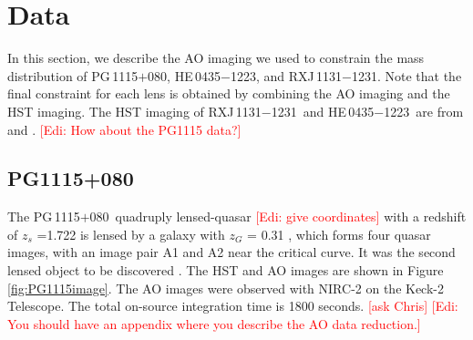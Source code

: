 \documentclass[useAMS,usenatbib]{mnras}
\newcommand\todo[1]{\textcolor{red}{#1}}
\newcommand\rxj{RXJ\,1131$-$1231}
\newcommand\he{HE\,0435$-$1223}
\newcommand\pg{PG\,1115$+$080}
\def\kms {\rm km\,s^{-1}}
\begin{document}







\section{Data}
In this section, we describe the AO imaging we used to constrain the mass distribution of \pg, \he, and \rxj. Note that the final constraint for each lens is obtained by combining the AO imaging and the HST imaging. The HST imaging of \rxj~and \he~are from \citet{SuyuEtal13} and \citet{WongEtal17}. \todo{[Edi: How about the PG1115 data?]}
\label{sec:data}




\subsection{PG1115+080}
The \pg~quadruply lensed-quasar \todo{[Edi: give coordinates]} with a redshift of $z_{s}$ =1.722 is lensed by a galaxy with $z_{G}$ = 0.31 \citep{HenryEtal86,ChristianEtal87,Tonry98}, which forms four quasar images, with an image pair A1 and A2 near the critical curve. It was the second lensed object to be discovered \citep{WeymannEtal80}. 
The HST and AO images are shown in Figure \ref{fig:PG1115image}. The AO images were observed with NIRC-2 on the Keck-2 Telescope. The total on-source integration time is 1800 seconds.
\todo{[ask Chris]} \todo{[Edi: You should have an appendix where you describe the AO data reduction.]}
\end{document}
